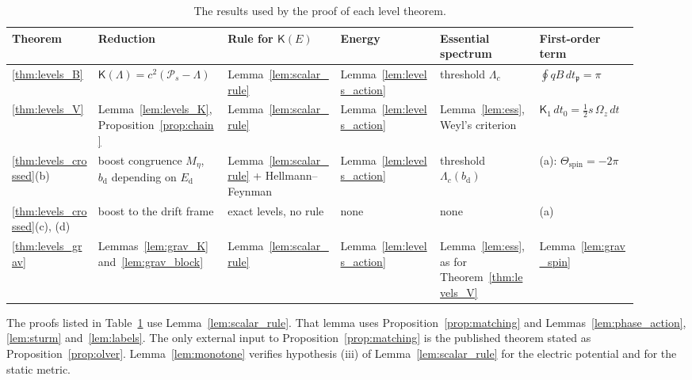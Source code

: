 \documentclass[aps,prd,onecolumn,tightenlines,nofootinbib,notitlepage,11pt,floatfix]{revtex4-2}
\theoremstyle{indentedtheorem}
\begin{document}
\begin{table}[htbp]
\centering
\small
\setlength{\tabcolsep}{3pt}
\caption{The results used by the proof of each level theorem.}
\label{tab:proofs_use}
\begin{tabular}{p{0.13\linewidth}p{0.17\linewidth}p{0.17\linewidth}p{0.15\linewidth}p{0.15\linewidth}p{0.15\linewidth}}
\hline
\textbf{Theorem} & \textbf{Reduction} & \textbf{Rule for $\mathsf{K}(E)$} & \textbf{Energy} & \textbf{Essential spectrum} & \textbf{First-order term} \\
\hline
\ref{thm:levels_B} & $\mathsf{K}(\Lambda)=c^2(\mathcal{P}_s-\Lambda)$ & Lemma~\ref{lem:scalar_rule} & Lemma~\ref{lem:levels_action} & threshold $\Lambda_c$ & $\oint qB\,dt_\mathfrak{p}=\pi$ \\
\ref{thm:levels_V} & Lemma~\ref{lem:levels_K}, Proposition~\ref{prop:chain} & Lemma~\ref{lem:scalar_rule} & Lemma~\ref{lem:levels_action} & Lemma~\ref{lem:ess}, Weyl's criterion & $\mathsf{K}_1\,dt_0=\tfrac{1}{2}s\,\Omega_z\,dt$ \\
\ref{thm:levels_crossed}(b) & boost congruence $M_\eta$, $b_\text{d}$ depending on $E_\text{d}$ & Lemma~\ref{lem:scalar_rule} + Hellmann--Feynman & Lemma~\ref{lem:levels_action} & threshold $\Lambda_c(b_\text{d})$ & (a): $\Theta_\text{spin}=-2\pi$ \\
\ref{thm:levels_crossed}(c), (d) & boost to the drift frame & exact levels, no rule & none & none & (a) \\
\ref{thm:levels_grav} & Lemmas~\ref{lem:grav_K} and~\ref{lem:grav_block} & Lemma~\ref{lem:scalar_rule} & Lemma~\ref{lem:levels_action} & Lemma~\ref{lem:ess}, as for Theorem~\ref{thm:levels_V} & Lemma~\ref{lem:grav_spin} \\
\hline
\end{tabular}
\end{table}

The proofs listed in Table~\ref{tab:proofs_use} use Lemma~\ref{lem:scalar_rule}. That lemma uses Proposition~\ref{prop:matching} and Lemmas~\ref{lem:phase_action}, \ref{lem:sturm} and~\ref{lem:labels}. The only external input to Proposition~\ref{prop:matching} is the published theorem stated as Proposition~\ref{prop:olver}. Lemma~\ref{lem:monotone} verifies hypothesis (iii) of Lemma~\ref{lem:scalar_rule} for the electric potential and for the static metric.
\end{document}
